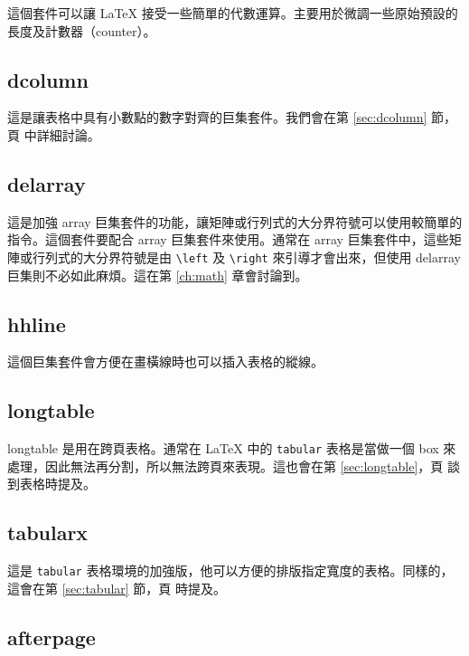 這個套件可以讓 \LaTeX{} 接受一些簡單的代數運算。主要用於微調一些原始預設的長度及計數器（counter）。

\subsection{dcolumn}

這是讓表格中具有小數點的數字對齊的巨集套件。我們會在第 \ref{sec:dcolumn} 節，頁 \pageref{sec:dcolumn} 中詳細討論。

\subsection{delarray}

這是加強 \textsf{array} 巨集套件的功能，讓矩陣或行列式的大分界符號可以使用較簡單的指令。這個套件要配合 \textsf{array} 巨集套件來使用。通常在 \textsf{array} 巨集套件中，這些矩陣或行列式的大分界符號是由 \verb|\left| 及 \verb|\right| 來引導才會出來，但使用 \textsf{delarray} 巨集則不必如此麻煩。這在第 \ref{ch:math} 章會討論到。

\subsection{hhline}

這個巨集套件會方便在畫橫線時也可以插入表格的縱線。

\subsection{longtable}

\textsf{longtable} 是用在跨頁表格。通常在 \LaTeX{} 中的 \texttt{tabular} 表格是當做一個 box 來處理，因此無法再分割，所以無法跨頁來表現。這也會在第 \ref{sec:longtable}，頁 \pageref{sec:longtable} 談到表格時提及。

\subsection{tabularx}

這是 \texttt{tabular} 表格環境的加強版，他可以方便的排版指定寬度的表格。同樣的，這會在第 \ref{sec:tabular} 節，頁 \pageref{sec:tabular} 時提及。

\subsection{afterpage}

